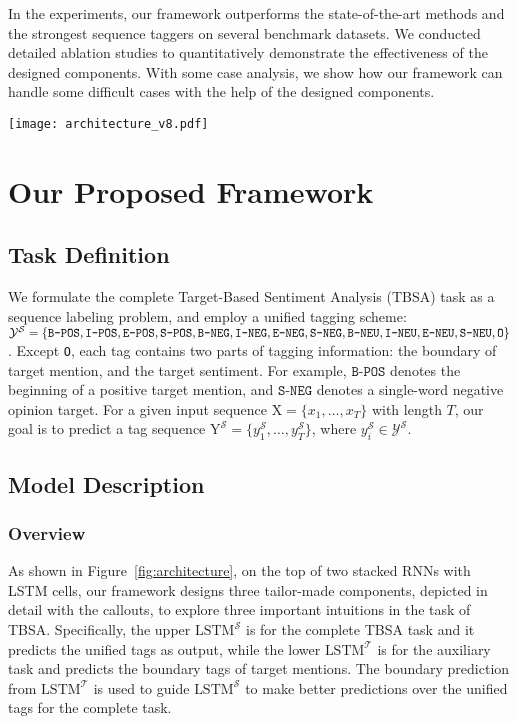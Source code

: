 \documentclass[letterpaper]{article} \usepackage{aaai19}  \usepackage{times}  \usepackage{helvet}  \usepackage{courier}  \usepackage{url}  \usepackage{graphicx}  \frenchspacing  \setlength{\pdfpagewidth}{8.5in}  \setlength{\pdfpageheight}{11in}
\begin{document}
In the experiments, our framework outperforms the state-of-the-art methods and the strongest sequence taggers on several benchmark datasets. We conducted detailed ablation studies to quantitatively demonstrate the effectiveness of the designed components. With some case analysis, we show how our framework can handle some difficult cases with the help of the designed components.

\begin{figure*}
    \centering
    \texttt{[image: architecture\_v8.pdf]}
    \caption{Architecture of the proposed framework.}
    \label{fig:architecture}
\end{figure*}


\section{Our Proposed Framework}
\subsection{Task Definition}

We formulate the complete Target-Based Sentiment Analysis (TBSA) task as a sequence labeling problem, and employ a unified tagging scheme: $\mathcal{Y}^{\mathcal{S}} = \{\texttt{B-POS},\texttt{I-POS},\texttt{E-POS}, \texttt{S-POS}, \texttt{B-NEG},\texttt{I-NEG},\texttt{E-NEG},\\ \texttt{S-NEG}, \texttt{B-NEU},\texttt{I-NEU},\texttt{E-NEU}, \texttt{S-NEU}, \texttt{O}\}$. 
Except \texttt{O}, each tag contains two parts of tagging information: the boundary of target mention, and the target sentiment. For example, $\texttt{B-POS}$ denotes the beginning of a positive target mention, and $\texttt{S-NEG}$ denotes a single-word negative opinion target. 
For a given input sequence $\mathrm{ X}=\{x_1,\dots,x_T\}$ with length $T$, our goal is to predict a tag sequence $\mathrm{ Y}^{\mathcal{S}}=\{y^{\mathcal{S}}_1,\dots,y^{\mathcal{S}}_T\}$, where $y^{\mathcal{S}}_i \in \mathcal{Y}^{\mathcal{S}}$.


\subsection{Model Description}
\subsubsection{Overview}
As shown in Figure~\ref{fig:architecture}, on the top of two stacked RNNs with LSTM cells, our framework designs three tailor-made components, depicted in detail with the callouts, to explore three important intuitions in the task of TBSA. 
Specifically, the upper $\text{LSTM}^{\mathcal{S}}$ is for the complete TBSA task and it predicts the unified tags as output, while the lower $\text{LSTM}^{\mathcal{T}}$ is for the auxiliary task and predicts the boundary tags of target mentions. The boundary prediction from $\text{LSTM}^{\mathcal{T}}$ is used to guide $\text{LSTM}^{\mathcal{S}}$ to make better predictions over the unified tags for the complete task. 
\end{document}
